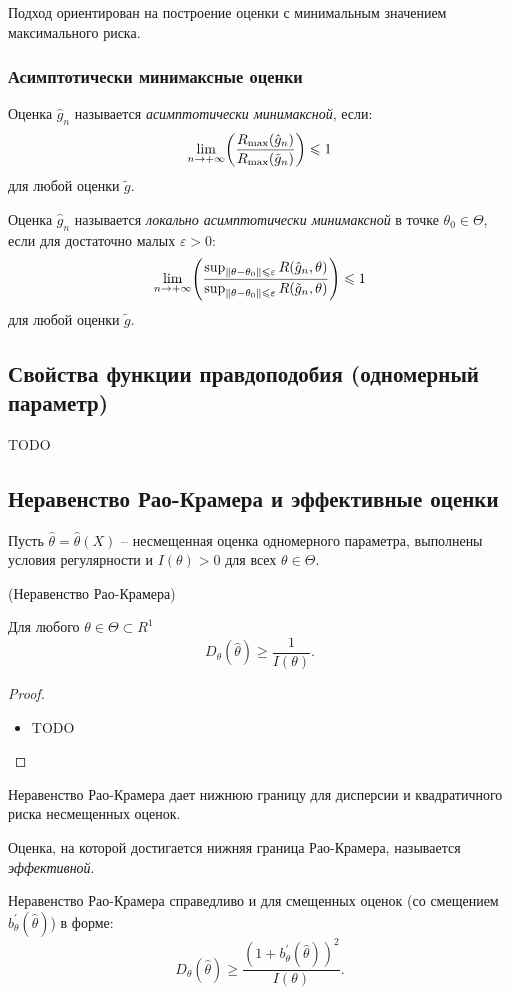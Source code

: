 Подход ориентирован на построение оценки с минимальным значением максимального риска.

\subsubsection{Асимптотически минимаксные оценки}
\begin{definition}
	Оценка $\hat{g}_{n}$ называется \textit{асимптотически минимаксной}, если:
	\[
		\lim_{n \to +\infty}\parens*{\frac{R_{\max}(\hat{g}_n)}{R_{\max}(\tilde{g}_n)}} \leqslant 1
	\]
	для любой оценки $\tilde{g}$.
\end{definition}

\begin{definition}
	Оценка $\hat{g}_{n}$ называется \textit{локально асимптотически минимаксной} в точке $\theta_{0} \in \Theta$, если для достаточно малых $\varepsilon > 0$:
	\[
		\lim_{n \to +\infty}\parens*{\frac{\sup_{\|\theta - \theta_0\| \leqslant \varepsilon} R(\hat{g}_n, \theta)}{\sup_{\|\theta - \theta_0\| \leqslant \varepsilon} R(\tilde{g}_n, \theta)}} \leqslant 1
	\]
	для любой оценки $\tilde{g}$.
\end{definition}

\subsection{Свойства функции правдоподобия (одномерный параметр)}
TODO

\subsection{Неравенство Рао-Крамера и эффективные оценки}
Пусть $\hat{\theta} = \hat{\theta}(X)$ -- несмещенная оценка одномерного параметра, выполнены условия регулярности и $I(\theta) > 0$ для всех $\theta \in \Theta$.

\begin{theorem}(Неравенство Рао-Крамера)

	Для любого $\theta \in \Theta \subset R^{1}$
	\[
		D_{\theta}(\hat{\theta}) \geqslant \frac{1}{I(\theta)}
	.\]
\end{theorem}
\begin{proof}
	\enewline
        \begin{itemize}
		\item TODO
	\end{itemize}
\end{proof}

Неравенство Рао-Крамера дает нижнюю границу для дисперсии и квадратичного риска несмещенных оценок.

\begin{definition}
	Оценка, на которой достигается нижняя граница Рао-Крамера, называется \textit{эффективной}.
\end{definition}

\begin{remark}
	Неравенство Рао-Крамера справедливо и для смещенных оценок (со смещением $b^{'}_{\theta}(\hat{\theta})$) в форме:
	\[
		D_{\theta}(\hat{\theta}) \geqslant \frac{(1 + b^{'}_{\theta}(\hat{\theta}))^2}{I(\theta)}
	.\]
\end{remark}

